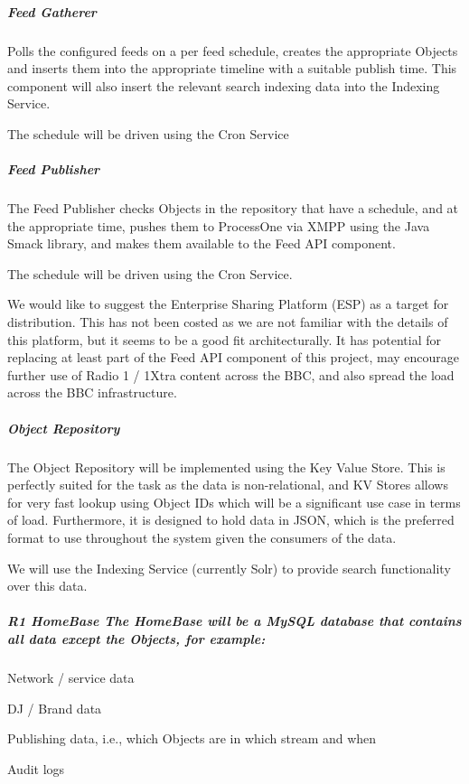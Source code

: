 \documentclass[a4paper, 11pt]{scrreprt}
\begin{document}
\subparagraph{Feed Gatherer}
\label{h.d008j7blrve}
Polls the configured feeds on a per feed schedule, creates the appropriate Objects and inserts them into the appropriate timeline with a suitable publish time. This component will also insert the relevant search indexing data into the Indexing Service.

The schedule will be driven using the Cron Service


\subparagraph{Feed Publisher}
\label{h.wgj49yb47tlh}
The Feed Publisher checks Objects in the repository that have a schedule, and at the appropriate time, pushes them to ProcessOne via XMPP using the Java Smack library, and makes them available to the Feed API component.

The schedule will be driven using the Cron Service.

We would like to suggest the Enterprise Sharing Platform (ESP) as a target for distribution. This has not been costed as we are not familiar with the details of this platform, but it seems to be a good fit architecturally. It has potential for replacing at least part of the Feed API component of this project, may encourage further use of Radio 1 / 1Xtra content across the BBC, and also spread the load across the BBC infrastructure.


\subparagraph{Object Repository}
\label{h.jm21oluk2m0n}
The Object Repository will be implemented using the Key Value Store. This is perfectly suited for the task as the data is non-relational, and KV Stores allows for very fast lookup using Object IDs which will be a significant use case in terms of load. Furthermore, it is designed to hold data in JSON, which is the preferred format to use throughout the system given the consumers of the data.

We will use the Indexing Service (currently Solr) to provide search functionality over this data.


\subparagraph{R1 HomeBase The HomeBase will be a MySQL database that contains all data except the Objects, for example:}
\label{h.zhey76kms5s}


\begin{tystrul}


\item Network / service data

\item DJ / Brand data

\item Publishing data, i.e., which Objects are in which stream and when

\item Audit logs 

\end{tystrul}
\end{document}
